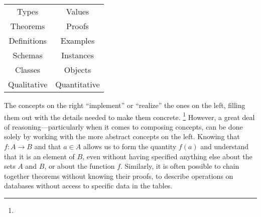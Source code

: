\begin{center}
    \singlespacingplus
    \begin{tabular}{c|c}
        Types & Values \\ 
        Theorems & Proofs \\
        Definitions & Examples \\
        Schemas & Instances \\
        Classes & Objects \\
        Qualitative & Quantitative 
    \end{tabular}
\end{center}

The concepts on the right ``implement'' or ``realize'' the ones on the left, filling them out with the details needed to make them concrete.
\unskip\footnote{}
However, a great deal of reasoning---particularly when it comes to composing concepts, can be done solely by working with the more abstract concepts on the left. 
Knowing that $f : A \to B$ and that $a \in A$ allows us to form the quantity $f(a)$ and understand that it is an element of $B$, even without having specified anything else about the sets $A$ and $B$, or about the function $f$.
Similarly, it is often possible to chain together theorems without knowing their proofs, to describe operations on databases without access to specific data in the tables. 

